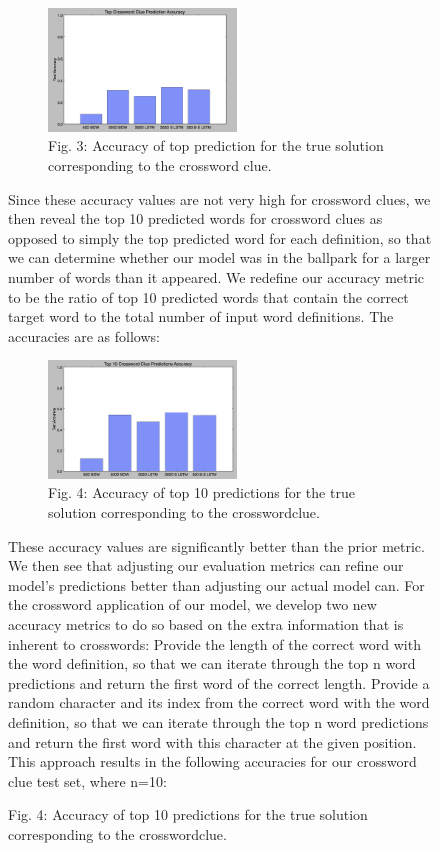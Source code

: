 \documentclass{article} %
\begin{document}
\begin{figure}
\begin{figure}
    \centering
	\includegraphics[width=50mm]{REAL_topcrossclue.png}
	\caption{Fig. 3: Accuracy of top prediction for the true solution corresponding to the crossword clue.}
\end{figure}

Since these accuracy values are not very high for crossword clues, we then reveal the top 10 predicted words for crossword clues as opposed to simply the top predicted word for each definition, so that we can determine whether our model was in the ballpark for a larger number of words than it appeared. We redefine our accuracy metric to be the ratio of top 10 predicted words that contain the correct target word to the total number of input word definitions. The accuracies are as follows:

\begin{figure}
    \centering
	\includegraphics[width=50mm]{top10cross.png}
	\caption{Fig. 4: Accuracy of top 10 predictions for the true solution corresponding to the crosswordclue.}
\end{figure}

These accuracy values are significantly better than the prior metric. We then see that adjusting our evaluation metrics can refine our model’s predictions better than adjusting our actual model can. For the crossword application of our model, we develop two new accuracy metrics to do so based on the extra information that is inherent to crosswords:
Provide the length of the correct word with the word definition, so that we can iterate through the top n word predictions and return the first word of the correct length.
Provide a random character and its index from the correct word with the word definition, so that we can iterate through the top n word predictions and return the first word with this character at the given position. 
This approach results in the following accuracies for our crossword clue test set, where n=10:


\end{figure}
\end{document}
